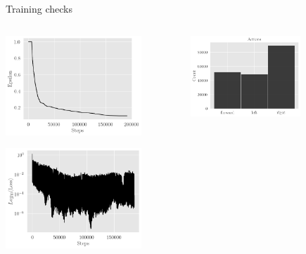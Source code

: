 \documentclass[bigger]{beamer}
\begin{document}
\begin{frame}[label={sec:org4244539}]{Training checks}
\begin{columns}
\begin{column}[c]{0.5\columnwidth}
\begin{center}
\includegraphics[width=0.8\textwidth]{img/exploration-rate.png}
\end{center}
\begin{center}
\includegraphics[width=0.8\textwidth]{img/loss.png}
\end{center}
\end{column}
\begin{column}[c]{0.5\columnwidth}
\begin{center}
\includegraphics[width=0.65\textwidth]{img/actions-distribution.png}

\end{center}
\end{column}
\end{columns}
\end{frame}
\end{document}
